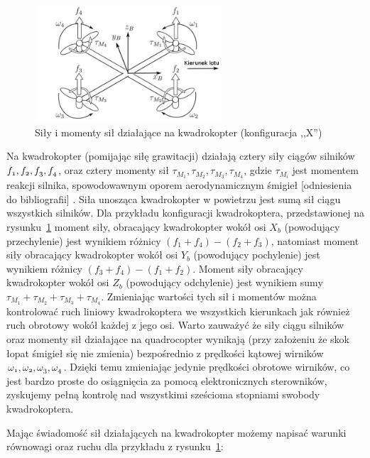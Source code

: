 \begin{figure}[H]
	\centering
		\includegraphics[width=0.62\textwidth]{Pictures/quadrotor_forces.png}
		\caption[Siły i momenty sił działające na kwadrokopter]{Siły i momenty sił działające na kwadrokopter (konfiguracja ,,X'')}
	\label{fig:quadrotor_forces}
\end{figure}


Na kwadrokopter (pomijając siłę grawitacji) działają cztery siły ciągów silników $\mathnormal{f_1, f_2, f_3, f_4}$, oraz cztery momenty sił $\tau_{M_1}, \tau_{M_2}, \tau_{M_3}, \tau_{M_4}$, gdzie $\tau_{M_i}$ jest momentem reakcji silnika, spowodowawnym oporem aerodynamicznym śmigieł [odniesienia do bibliografii] . 
Siła unosząca kwadrokopter w powietrzu jest sumą sił ciągu wszystkich silników. Dla przykładu konfiguracji kwadrokoptera, przedstawionej na rysunku~\ref{fig:quadrotor_forces} moment siły, obracający kwadrokopter wokół osi $X_b$ (powodujący przechylenie) jest wynikiem różnicy $(f_1 + f_4) - (f_2 + f_3)$, natomiast moment siły obracający kwadrokopter wokół osi $Y_b$ (powodujący pochylenie) jest wynikiem różnicy $(f_3 + f_4) - (f_1 + f_2)$. 
Moment siły obracający kwadrokopter wokół osi $Z_b$ (powodujący odchylenie) jest wynikiem sumy $\tau_{M_1} + \tau_{M_2} + \tau_{M_3} + \tau_{M_4}$.  Zmieniając wartości tych sił i momentów można kontrolować ruch liniowy kwadrokoptera we wszystkich kierunkach jak również ruch obrotowy wokół każdej z jego osi. Warto zauważyć że siły ciągu silników oraz momenty sił działające na quadrocopter wynikają (przy założeniu że skok łopat śmigieł się nie zmienia) bezpośrednio z prędkości kątowej wirników $\mathnormal{\omega_1, \omega_2, \omega_3, \omega_4}$. Dzięki temu zmieniając jedynie prędkości obrotowe wirników, co jest bardzo proste do osiągnięcia za pomocą elektronicznych sterowników, zyskujemy pełną kontrolę nad wszystkimi sześcioma stopniami swobody kwadrokoptera.  

Mając świadomość sił działających na kwadrokopter możemy napisać warunki równowagi oraz ruchu dla przykładu z rysunku~\ref{fig:quadrotor_forces}:

